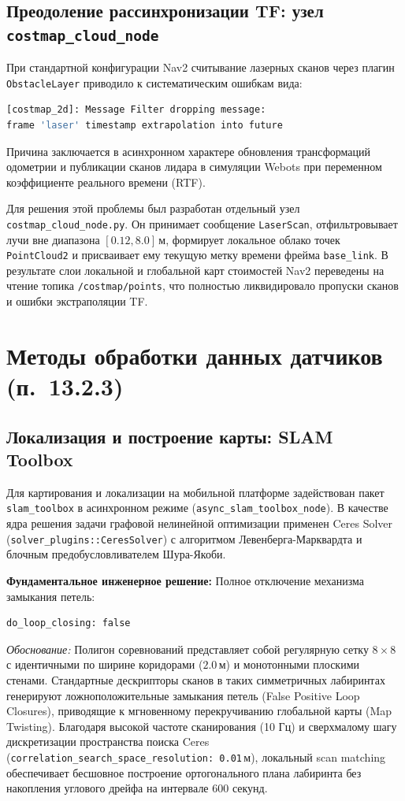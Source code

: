 \documentclass[a4paper,11pt]{article}
\begin{document}
\subsection{Преодоление рассинхронизации TF: узел \texttt{costmap\_cloud\_node}}
При стандартной конфигурации Nav2 считывание лазерных сканов через плагин \texttt{ObstacleLayer} приводило к систематическим ошибкам вида:
\begin{lstlisting}[language=bash]
[costmap_2d]: Message Filter dropping message:
frame 'laser' timestamp extrapolation into future
\end{lstlisting}
Причина заключается в асинхронном характере обновления трансформаций одометрии и публикации сканов лидара в симуляции Webots при переменном коэффициенте реального времени (RTF). 

Для решения этой проблемы был разработан отдельный узел \texttt{costmap\_cloud\_node.py}. Он принимает сообщение \texttt{LaserScan}, отфильтровывает лучи вне диапазона $[0.12, 8.0]$\,м, формирует локальное облако точек \texttt{PointCloud2} и присваивает ему текущую метку времени фрейма \texttt{base\_link}. В результате слои локальной и глобальной карт стоимостей Nav2 переведены на чтение топика \texttt{/costmap/points}, что полностью ликвидировало пропуски сканов и ошибки экстраполяции TF.

\section{Методы обработки данных датчиков (п.~13.2.3)}

\subsection{Локализация и построение карты: SLAM Toolbox}
Для картирования и локализации на мобильной платформе задействован пакет \texttt{slam\_toolbox} в асинхронном режиме (\texttt{async\_slam\_toolbox\_node}). В качестве ядра решения задачи графовой нелинейной оптимизации применен Ceres Solver (\texttt{solver\_plugins::CeresSolver}) с алгоритмом Левенберга-Марквардта и блочным предобусловливателем Шура-Якоби.

\textbf{Фундаментальное инженерное решение:} Полное отключение механизма замыкания петель:
\begin{lstlisting}[language=bash]
do_loop_closing: false
\end{lstlisting}
\textit{Обоснование:} Полигон соревнований представляет собой регулярную сетку $8 \times 8$ с идентичными по ширине коридорами ($2.0$\,м) и монотонными плоскими стенами. Стандартные дескрипторы сканов в таких симметричных лабиринтах генерируют ложноположительные замыкания петель (False Positive Loop Closures), приводящие к мгновенному перекручиванию глобальной карты (Map Twisting). Благодаря высокой частоте сканирования (10 Гц) и сверхмалому шагу дискретизации пространства поиска Ceres (\texttt{correlation\_search\_space\_resolution: 0.01}\,м), локальный scan matching обеспечивает бесшовное построение ортогонального плана лабиринта без накопления углового дрейфа на интервале 600 секунд.
\end{document}
